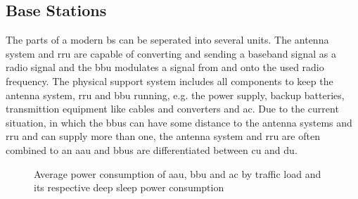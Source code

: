 \documentclass[11pt,a4paper]{article}
\begin{document}
\subsection{Base Stations}\label{subsec:BSConsumption}

The parts of a modern \acrshort{bs} can be seperated into several units.
The antenna system and \acrfull{rru} are capable of converting and sending a baseband signal as a radio signal and the \acrfull{bbu} modulates a signal from and onto the used radio frequency.
The physical support system includes all components to keep the antenna system, \acrshort{rru} and \acrshort{bbu} running, e.g. the power supply, backup batteries, transmittion equipment like cables and converters and \acrfull{ac}.
Due to the current situation, in which the \acrshort{bbu}s can have some distance to the antenna systems and \acrshort{rru} and can supply more than one, the antenna system and \acrshort{rru} are often combined to an \acrfull{aau} and \acrshort{bbu}s are differentiated between \acrfull{cu} and \acrfull{du}.

\begin{figure}[h]
  \centering
  \caption{Average power consumption of  \acrshort{aau}, \acrshort{bbu} and \acrshort{ac} by traffic load and its respective deep sleep power consumption \citep{green5G}}
  \label{fig:BSConsumption}
\end{figure}
\end{document}
